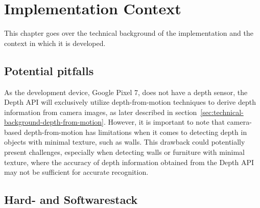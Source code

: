 \chapter{Implementation Context}

This chapter goes over the technical background of the implementation and the context in which it is developed.



%
%
%


\section{Potential pitfalls}
As the development device, Google Pixel 7, does not have a depth sensor,
the Depth API will exclusively utilize depth-from-motion techniques to derive depth information from camera images, as later described in section~\ref{sec:technical-background-depth-from-motion}.
However, it is important to note that camera-based depth-from-motion has limitations
when it comes to detecting depth in objects with minimal texture, such as walls.
This drawback could potentially present challenges, especially when detecting walls or furniture with minimal texture,
where the accuracy of depth information obtained from the Depth API may not be sufficient for accurate recognition. \parencite{google_llc_arcore_doc}

\section{Hard- and Softwarestack}

